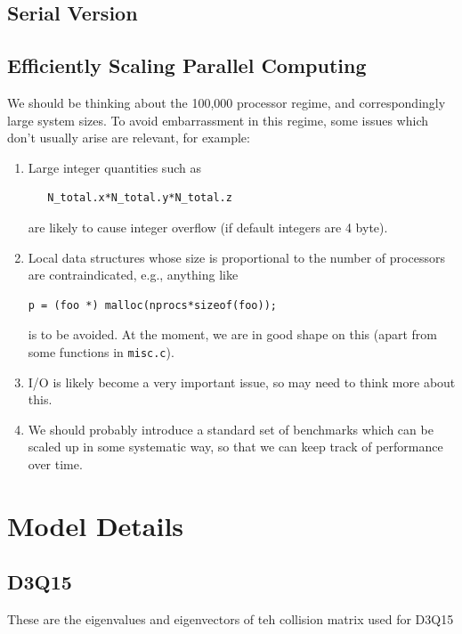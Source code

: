 \subsection{Serial Version}

\subsection{Efficiently Scaling Parallel Computing}

We should be thinking about the 100,000 processor regime, and
correspondingly large system sizes. To avoid embarrassment in this regime,
some issues which don't usually arise are relevant, for example:

\begin{enumerate}
\item
Large integer quantities such as
\begin{verbatim}
   N_total.x*N_total.y*N_total.z
\end{verbatim}
are likely to cause integer overflow (if default integers are 4 byte).
\item
Local data structures whose size is proportional
to the number of processors are contraindicated, e.g.,
anything like
\begin{verbatim}
p = (foo *) malloc(nprocs*sizeof(foo));
\end{verbatim}
is to be avoided. At the moment, we are in good shape on this
(apart from some functions in \texttt{misc.c}).
\item
I/O is likely become a very important issue, so may need to think
more about this.
\item
We should probably introduce a standard set of benchmarks which can
be scaled up in some systematic way, so that we can keep track of
performance over time.

\end{enumerate}


\section{Model Details}

\subsection{D3Q15}

These are the eigenvalues and eigenvectors of teh collision
matrix used for D3Q15


